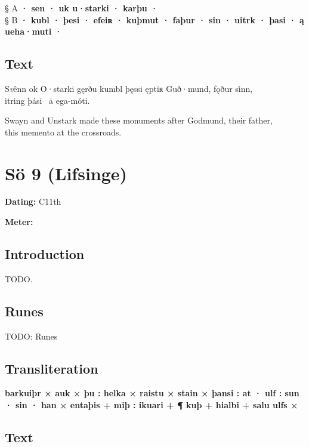 § A \textbf{· sen · uk u·starki · karþu ·} \\
§ B \textbf{· kubl · þesi · efeiʀ · kuþmut · faþur · sin · uitrk · þasi · ą ueha·muti ·}

\subsection{Text}

\bpg\bpa[0]%
\startsub S\emph{v}ênn ok Ȯ·starki gęrðu kumbl þęssi ęptiʀ Guð·mund, fǫður si̇nn,\endsub \\
itring þási \hld\ ȧ ega-móti. \epa

\bpb Swayn and Unstark made these monuments after Godmund, their father, \\
this memento at the crossroads.\epb\epg

\sectionline\clearpage


\section{Sö 9 (Lifsinge)}

\begin{flushright}%
\textbf{Dating:} C11th

\textbf{Meter:} \Fornyrdislag
\end{flushright}%

\subsection{Introduction}

TODO.

\subsection{Runes}

TODO: Runes%

\subsection{Transliteration}

\textbf{barkuiþr × auk × þu : helka × raistu × stain × þansi : at · ulf : sun · sin · han × entaþis + miþ : ikuari +
¶ kuþ + hialbi + salu ulfs ×}

\subsection{Text}

